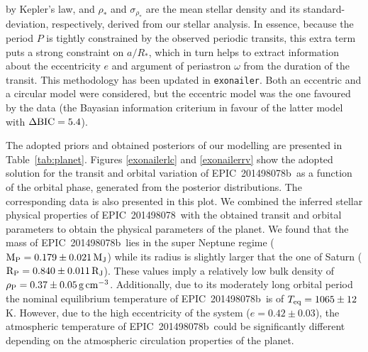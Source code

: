 \documentclass[useAMS,usenatbib]{mnras}
\newcommand{\teq}{\ensuremath{T_{\rm eq}}}
\newcommand{\mjup}{\ensuremath{{\rm M_{J}}}}
\newcommand{\mpl}{\ensuremath{{\rm M_P}}}
\newcommand{\rjup}{\ensuremath{{\rm R_J}}}
\newcommand{\rpl}{\ensuremath{{\rm R_P}}}
\newcommand{\mpkep}{\ensuremath{0.179 \pm 0.021 }}
\newcommand{\rpkep}{\ensuremath{0.840 \pm 0.011 }}
\newcommand{\plname}{EPIC~201498078b}
\newcommand{\stname}{EPIC~201498078}
\newcommand{\rhopl}{\ensuremath{{\rm \rho_P}}}
\newcommand{\rhopkep}{\ensuremath{0.37 \pm 0.05 }}
\newcommand{\gccm}{\ensuremath{\mathrm{g}\,\mathrm{cm}^{-3}}}
\begin{document}
by Kepler's law, and 
$\rho_*$ and $\sigma_{\rho_*}$ are the mean stellar density and its standard-deviation,
respectively, derived from our stellar analysis. In essence, because the period $P$ is 
tightly constrained by the observed periodic transits, this extra term puts a strong 
constraint on $a/R_*$, which in turn helps to extract information about the eccentricity $e$ and argument of periastron $\omega$ from the duration of the transit. This 
methodology has been updated in \texttt{exonailer}. Both an eccentric and a 
circular model were considered, but the eccentric model was the one favoured by the 
data (the Bayasian  information criterium in favour of the latter model with $\Delta \textnormal{BIC} = 5.4$).

The adopted priors and obtained posteriors of our modelling are presented in Table~\ref{tab:planet}.
Figures \ref{exonailerlc} and \ref{exonailerrv} show the adopted solution
for the transit and orbital variation of \plname\ as a function of the orbital phase, generated from the posterior distributions.
The corresponding data is also presented in this plot.
We combined the inferred stellar physical properties of \stname\ with the 
obtained transit and orbital parameters to obtain the physical parameters
of the planet.
We found that the mass of \plname\ lies in the super Neptune regime ($\mpl=\mpkep\,\mjup$) while its radius is slightly larger that the one of Saturn ($\rpl=\rpkep\,\rjup$).
These values imply a relatively low bulk density of $\rhopl=\rhopkep\,\gccm$. Additionally, due to its moderately long orbital period the nominal equilibrium temperature of \plname\ is of $\teq = 1065 \pm 12$\,K. However, due to the high eccentricity of the system ($e = 0.42 \pm 0.03$), the atmospheric
temperature of \plname\ could be significantly different depending on the
atmospheric circulation properties of the planet.
\end{document}
